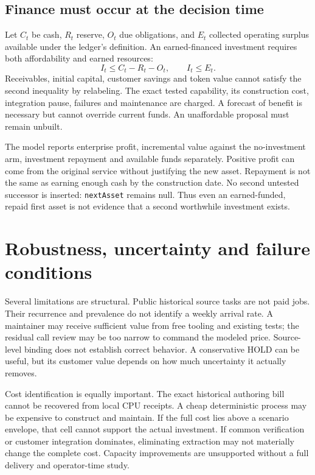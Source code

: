 \documentclass[11pt,a4paper]{article}
\begin{document}
\subsection{Finance must occur at the decision time}
Let $C_t$ be cash, $R_t$ reserve, $O_t$ due obligations, and $E_t$ collected operating surplus available under the ledger's definition. An earned-financed investment requires both affordability and earned resources:
\[
 I_t\le C_t-R_t-O_t,\qquad I_t\le E_t.
\]
Receivables, initial capital, customer savings and token value cannot satisfy the second inequality by relabeling. The exact tested capability, its construction cost, integration pause, failures and maintenance are charged. A forecast of benefit is necessary but cannot override current funds. An unaffordable proposal must remain unbuilt.

The model reports enterprise profit, incremental value against the no-investment arm, investment repayment and available funds separately. Positive profit can come from the original service without justifying the new asset. Repayment is not the same as earning enough cash by the construction date. No second untested successor is inserted: \texttt{nextAsset} remains null. Thus even an earned-funded, repaid first asset is not evidence that a second worthwhile investment exists.



\section{Robustness, uncertainty and failure conditions}
Several limitations are structural. Public historical source tasks are not paid jobs. Their recurrence and prevalence do not identify a weekly arrival rate. A maintainer may receive sufficient value from free tooling and existing tests; the residual call review may be too narrow to command the modeled price. Source-level binding does not establish correct behavior. A conservative HOLD can be useful, but its customer value depends on how much uncertainty it actually removes.

Cost identification is equally important. The exact historical authoring bill cannot be recovered from local CPU receipts. A cheap deterministic process may be expensive to construct and maintain. If the full cost lies above a scenario envelope, that cell cannot support the actual investment. If common verification or customer integration dominates, eliminating extraction may not materially change the complete cost. Capacity improvements are unsupported without a full delivery and operator-time study.
\end{document}
